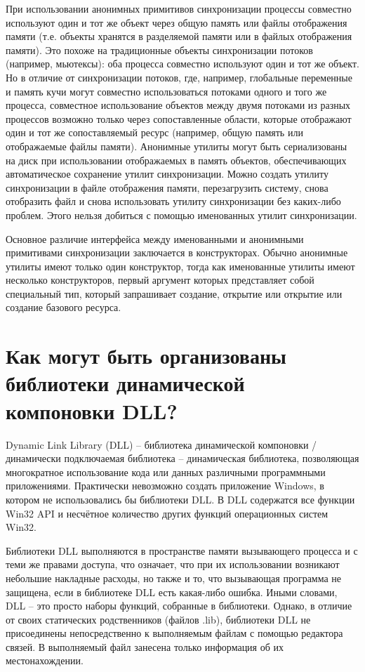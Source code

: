 \documentclass[a4paper,12pt]{article}	%
\begin{document}
	При использовании анонимных примитивов синхронизации процессы совместно используют один и тот же объект через общую память или файлы отображения памяти (т.е. объекты хранятся в разделяемой памяти или в файлых отображения памяти). Это похоже на традиционные объекты синхронизации потоков (например, мьютексы): оба процесса совместно используют один и тот же объект. Но в отличие от синхронизации потоков, где, например, глобальные переменные и память кучи могут совместно использоваться потоками одного и того же процесса, совместное использование объектов между двумя потоками из разных процессов возможно только через сопоставленные области, которые отображают один и тот же сопоставляемый ресурс (например, общую память или отображаемые файлы памяти). Анонимные утилиты могут быть сериализованы на диск при использовании отображаемых в память объектов, обеспечивающих автоматическое сохранение утилит синхронизации. Можно создать утилиту синхронизации в файле отображения памяти, перезагрузить систему, снова отобразить файл и снова использовать утилиту синхронизации без каких-либо проблем. Этого нельзя добиться с помощью именованных утилит синхронизации.

		Основное различие интерфейса между именованными и анонимными примитивами синхронизации заключается в конструкторах. Обычно анонимные утилиты имеют только один конструктор, тогда как именованные утилиты имеют несколько конструкторов, первый аргумент которых представляет собой специальный тип, который запрашивает создание, открытие или открытие или создание базового ресурса.
		
\section{Как могут быть организованы библиотеки динамической компоновки DLL?}
	
	Dynamic Link Library (DLL) -- библиотека динамической компоновки / динамически подключаемая библиотека -- динамическая библиотека, позволяющая многократное использование кода или данных различными программными приложениями. Практически невозможно создать приложение Windows, в котором не использовались бы библиотеки DLL. В DLL содержатся все функции Win32 API и несчётное количество других функций операционных систем Win32.	
	
	Библиотеки DLL выполняются в пространстве памяти вызывающего процесса и с теми же правами доступа, что означает, что при их использовании возникают небольшие накладные расходы, но также и то, что вызывающая программа не защищена, если в библиотеке DLL есть какая-либо ошибка. Иными словами, DLL -- это просто наборы функций, собранные в библиотеки. Однако, в отличие от своих статических родственников (файлов .lib), библиотеки DLL не присоединены непосредственно к выполняемым файлам с помощью редактора связей. В выполняемый файл занесена только информация об их местонахождении.
	
\end{document}
